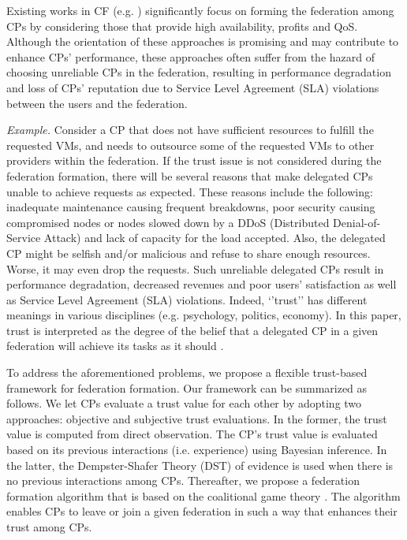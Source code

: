 \documentclass[preprint]{elsarticle}
\theoremstyle{definition}
\theoremstyle{remark}
\theoremstyle{property}
\begin{document}
Existing works in CF (e.g. \cite{buyya2010intercloud} \cite{celesti2010enhance} \cite{fazio2015enhance} \cite{goiri2010characterizing} \cite{mashayekhy2015cloud}) significantly focus on forming the federation among CPs by considering those that provide high
availability, profits and QoS. Although the orientation of these approaches is promising and may contribute to enhance CPs' performance, these approaches often suffer from the hazard of choosing unreliable CPs in the federation, resulting in performance degradation and loss of CPs’
reputation due to Service Level Agreement (SLA) violations between the users and the federation.

\textit{Example.} Consider a CP that does not have
sufficient resources to fulfill the requested VMs, and
needs to outsource some of the requested VMs to other
providers within the federation. If the trust issue is
not considered during the federation formation, there will be several reasons that make delegated CPs unable to achieve requests as expected. These reasons include the following: inadequate maintenance causing frequent breakdowns, poor security causing compromised nodes or nodes slowed down by a DDoS (Distributed Denial-of-Service Attack) and lack of capacity
for the load accepted. Also, the delegated CP might be selfish and/or malicious and refuse to share enough resources. Worse, it may even drop the requests.
Such unreliable delegated CPs result in performance degradation, decreased revenues and poor users’ satisfaction as well as Service Level Agreement (SLA) violations. Indeed, ‘’trust’’ has different meanings in various disciplines (e.g. psychology, politics, economy). In this paper, trust is interpreted as the degree of the belief that a delegated CP in a given federation will achieve its tasks as it should \cite{bu2011distributed} \cite{hassan2015qos}.

To address the aforementioned problems, we propose a flexible trust-based framework for federation formation. Our framework can be summarized
as follows. We let CPs evaluate a trust value for each other by adopting two approaches: objective and subjective trust evaluations. In the former, the trust value is computed from direct observation. The CP's trust value is evaluated based on its previous interactions (i.e. experience) using Bayesian inference. In the latter, the Dempster-Shafer Theory (DST) of evidence is used when there is no previous interactions among CPs. Thereafter, we propose a federation formation algorithm that is based on the coalitional game theory \cite{ray2007game}. The algorithm enables CPs to leave or join a given federation in such a way that enhances their trust among CPs.
\end{document}
